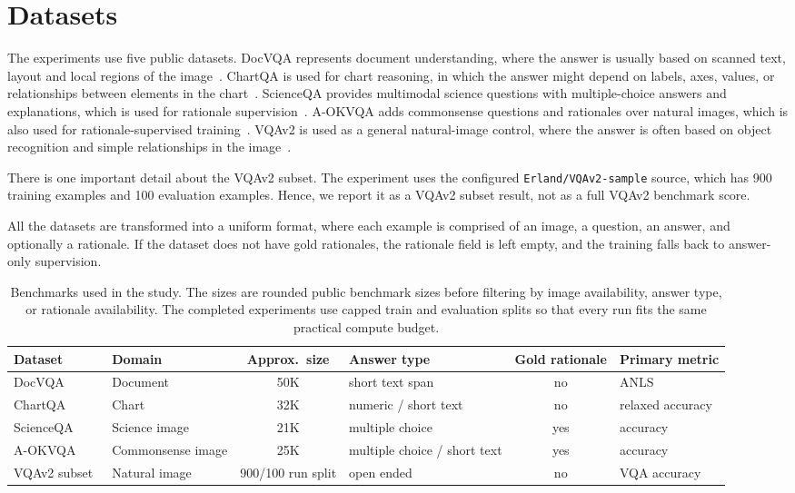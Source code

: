\documentclass[12pt,bibliography=totoc,listof=totoc,BCOR=5mm,DIV=12,oneside,open=any]{scrbook}
\let\cite\citep
\begin{document}
\section{Datasets}
The experiments use five public datasets.
DocVQA represents document understanding, where the answer is usually based on scanned text, layout and local regions of the image~\cite{mathew2021docvqa}.
ChartQA is used for chart reasoning, in which the answer might depend on labels, axes, values, or relationships between elements in the chart~\cite{masry2022chartqa}.
ScienceQA provides multimodal science questions with multiple-choice answers and explanations, which is used for rationale supervision~\cite{lu2022scienceqa}.
A-OKVQA adds commonsense questions and rationales over natural images, which is also used for rationale-supervised training~\cite{schwenk2022aokvqa}.
VQAv2 is used as a general natural-image control, where the answer is often based on object recognition and simple relationships in the image~\cite{goyal2017vqav2}.

There is one important detail about the VQAv2 subset.
The experiment uses the configured \texttt{Erland/VQAv2-sample} source, which has 900 training examples and 100 evaluation examples.
Hence, we report it as a VQAv2 subset result, not as a full VQAv2 benchmark score.

All the datasets are transformed into a uniform format, where each example is comprised of an image, a question, an answer, and optionally a rationale.
If the dataset does not have gold rationales, the rationale field is left empty, and the training falls back to answer-only supervision.


\begin{table}[!ht]
\centering
\caption{Benchmarks used in the study. The sizes are rounded public benchmark sizes before filtering by image availability, answer type, or rationale availability. The completed experiments use capped train and evaluation splits so that every run fits the same practical compute budget.}
\label{tab:Datasets}
\begin{adjustbox}{max width=\textwidth}
\begin{tabular}{|l|l|c|l|c|l|}
\hline
\textbf{Dataset} & \textbf{Domain} & \textbf{Approx.\ size} & \textbf{Answer type} & \textbf{Gold rationale} & \textbf{Primary metric} \\ \hline
DocVQA~\cite{mathew2021docvqa} & Document & 50K & short text span & no & ANLS \\
ChartQA~\cite{masry2022chartqa} & Chart & 32K & numeric / short text & no & relaxed accuracy \\
ScienceQA~\cite{lu2022scienceqa} & Science image & 21K & multiple choice & yes & accuracy \\
A-OKVQA~\cite{schwenk2022aokvqa} & Commonsense image & 25K & multiple choice / short text & yes & accuracy \\
VQAv2 subset~\cite{goyal2017vqav2} & Natural image & 900/100 run split & open ended & no & VQA accuracy \\ \hline
\end{tabular}
\end{adjustbox}
\end{table}
\end{document}
